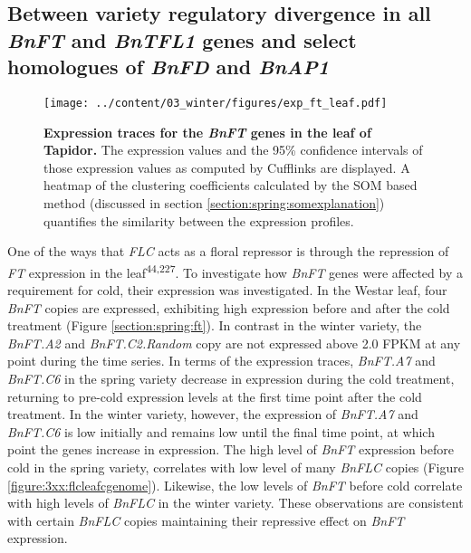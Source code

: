 \documentclass[12pt,]{book}
\begin{document}
\subsection{\texorpdfstring{Between variety regulatory divergence in all
\emph{BnFT} and \emph{BnTFL1} genes and select homologues of \emph{BnFD}
and
\emph{BnAP1}}{Between variety regulatory divergence in all BnFT and BnTFL1 genes and select homologues of BnFD and BnAP1}}\label{section:winter:floraldifferences}

\begin{figure}[htbp]
\centering
\texttt{[image: ../content/03\_winter/figures/exp\_ft\_leaf.pdf]}
\caption{\textbf{Expression traces for the \emph{BnFT} genes in the leaf
of Tapidor.} The expression values and the 95\% confidence intervals of
those expression values as computed by Cufflinks are displayed. A
heatmap of the clustering coefficients calculated by the SOM based
method (discussed in section \ref{section:spring:somexplanation})
quantifies the similarity between the expression
profiles.}\label{figure:3xx:ftleaf}
\end{figure}

One of the ways that \emph{FLC} acts as a floral repressor is through
the repression of \emph{FT} expression in the
leaf\textsuperscript{44,227}. To investigate how \emph{BnFT} genes were
affected by a requirement for cold, their expression was investigated.
In the Westar leaf, four \emph{BnFT} copies are expressed, exhibiting
high expression before and after the cold treatment (Figure
\ref{section:spring:ft}). In contrast in the winter variety, the
\emph{BnFT.A2} and \emph{BnFT.C2.Random} copy are not expressed above
2.0 FPKM at any point during the time series. In terms of the expression
traces, \emph{BnFT.A7} and \emph{BnFT.C6} in the spring variety decrease
in expression during the cold treatment, returning to pre-cold
expression levels at the first time point after the cold treatment. In
the winter variety, however, the expression of \emph{BnFT.A7} and
\emph{BnFT.C6} is low initially and remains low until the final time
point, at which point the genes increase in expression. The high level
of \emph{BnFT} expression before cold in the spring variety, correlates
with low level of many \emph{BnFLC} copies (Figure
\ref{figure:3xx:flcleafcgenome}). Likewise, the low levels of
\emph{BnFT} before cold correlate with high levels of \emph{BnFLC} in
the winter variety. These observations are consistent with certain
\emph{BnFLC} copies maintaining their repressive effect on \emph{BnFT}
expression.
\end{document}
